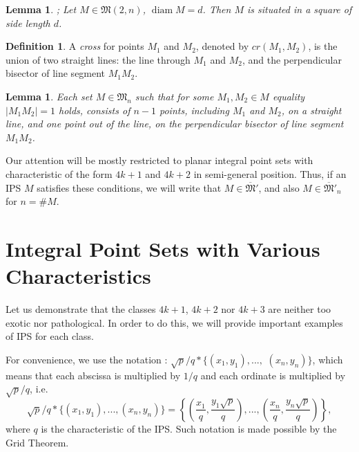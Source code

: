\documentclass[a4paper,14pt]{article} %
\theoremstyle{plain}
\newtheorem{lemma}[theorem]{Lemma}
\theoremstyle{definition}
\newtheorem{definition}[theorem]{Definition}
\begin{document}
\begin{lemma}
	\cite[Lemma 4]{our-vmmsh-2018-translit};
	\cite[Lemma 2.4]{my-pps-linear-bound-2019}
	\label{lem:square_container}
	Let $M\in\mathfrak{M}(2,n)$, $\operatorname{diam} M = d$.
	Then $M$ is situated in a square of side length $d$.
\end{lemma}

\begin{definition}
	\cite[Definition 2.5]{my-pps-linear-bound-2019}
	A \textit{cross} for points $M_1$ and $M_2$, denoted by $cr(M_1,M_2)$, is the union of two straight lines:
	the line through $M_1$ and $M_2$,
	and the perpendicular bisector of line segment $M_1 M_2$.
\end{definition}

\begin{lemma}
	\cite[Theorem 3.10]{my-pps-linear-bound-2019}
	\label{lem:no_distance_one}
	Each set $M\in\mathfrak{M}_n$
	such that for some $M_1,M_2 \in M$ equality $|M_1 M_2|=1$ holds,
	consists of $n-1$ points, including $M_1$ and $M_2$, on a straight line,
	and one point out of the line, on the perpendicular bisector of line segment $M_1 M_2$.
\end{lemma}



Our attention will be mostly restricted to planar integral point sets
with characteristic of the form $4k+1$ and $4k+2$ in semi-general position.
Thus, if an IPS $M$ satisfies these conditions,
we will write that
$M\in\overline{\mathfrak{M}}'$, and also $M\in\overline{\mathfrak{M}}'_n$ for $n=\#M$.





\section{Integral Point Sets with Various Characteristics}

Let us demonstrate that the classes $4k+1$, $4k+2$ nor $4k+3$
are neither too exotic nor pathological.
In order to do this, we will provide important examples of IPS for each class.

For convenience, we use the notation \cite{our-ped-2018,our-pmm-2018,our-vmmsh-2018-translit}:
$\sqrt{p}/q * \{ (x_1,y_1), ...,$ $ (x_n, y_n)  \}$,
which means that each abscissa is multiplied by $1/q$
and each ordinate is multiplied by $\sqrt{p}/q$,  i.e.
\begin{equation}
	\label{eq:char_lattice}
	\sqrt{p}/q * \{ (x_1,y_1), ..., (x_n, y_n)  \}
	=
	\left\{ \left(\frac{x_1}{q},\frac{y_1\sqrt{p}}{q}\right), ..., \left(\frac{x_n}{q},   \frac{y_n\sqrt{p}}{q}\right)  \right\}
	,
\end{equation}
where $q$ is the characteristic of the IPS.
Such notation is made possible by the Grid Theorem.
\end{document}
